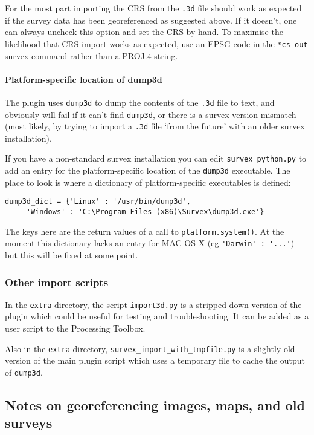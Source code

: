 \documentclass[]{article}
\let\oldparagraph\paragraph
\renewcommand{\paragraph}[1]{\oldparagraph{#1}\mbox{}}
\begin{document}
For the most part importing the CRS from the \verb}.3d} file should
work as expected if the survey data has been georeferenced as suggested
above. If it doesn't, one can always uncheck this option and set the CRS
by hand. To maximise the likelihood that CRS import works as expected,
use an EPSG code in the \verb}*cs out} survex command rather than a
PROJ.4 string.

\paragraph{Platform-specific location of
dump3d}\label{platform-specific-location-of-dump3d}

The plugin uses \verb}dump3d} to dump the contents of the \verb}.3d}
file to text, and obviously will fail if it can't find \verb}dump3d},
or there is a survex version mismatch (most likely, by trying to import
a \verb}.3d} file `from the future' with an older survex
installation).

If you have a non-standard survex installation you can edit
\verb}survex_python.py} to add an entry for the platform-specific
location of the \verb}dump3d} executable. The place to look is where a
dictionary of platform-specific executables is defined:

\begin{verbatim}
dump3d_dict = {'Linux' : '/usr/bin/dump3d',
     'Windows' : 'C:\Program Files (x86)\Survex\dump3d.exe'}
\end{verbatim}

The keys here are the return values of a call to
\verb}platform.system()}. At the moment this dictionary lacks an entry
for MAC OS X (eg \verb+'Darwin' : '...'+)
but this will be fixed at some point.

\subsubsection{Other import scripts}\label{other-import-scripts}

In the \verb}extra} directory, the script \verb}import3d.py} is a
stripped down version of the plugin which could be useful for testing
and troubleshooting. It can be added as a user script to the Processing
Toolbox.

Also in the \verb}extra} directory,
\verb}survex_import_with_tmpfile.py} is a slightly old version of
the main plugin script which uses a temporary file to cache the output
of \verb}dump3d}.

\subsection{Notes on georeferencing images, maps, and old
surveys}\label{notes-on-georeferencing-images-maps-and-old-surveys}
\end{document}
